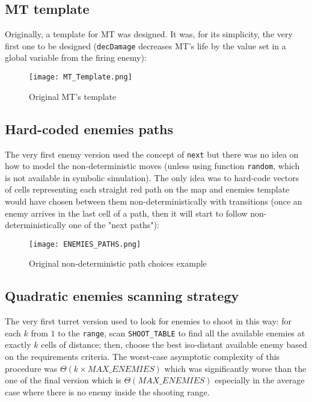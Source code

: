 \documentclass[
10pt, %
a4paper, %
oneside, %
headinclude,footinclude, %
BCOR5mm, %
]{scrartcl}
\begin{document}
		\subsection{MT template}
			Originally, a template for MT was designed. It was, for its simplicity, the very first one to be designed (\texttt{decDamage} decreases MT's life by the value set in a global variable from the firing enemy):
			
			\begin{figure}[h!]
				\centering
				\texttt{[image: MT\_Template.png]}
				\caption{Original MT's template}
			\end{figure}
		\subsection{Hard-coded enemies paths}
			The very first enemy version used the concept of \texttt{next} but there was no idea on how to model the non-deterministic moves (unless using function \texttt{random}, which is not available in symbolic simulation). The only idea was to hard-code vectors of cells representing each straight red path on the map and enemies template would have chosen between them non-deterministically with transitions (once an enemy arrives in the last cell of a path, then it will start to follow non-deterministically one of the "next paths"):
			
			\begin{figure}[h!]
				\centering
				\texttt{[image: ENEMIES\_PATHS.png]}
				\caption{Original non-deterministic path choices example}
			\end{figure}
		\subsection{Quadratic enemies scanning strategy}
			The very first turret version used to look for enemies to shoot in this way: for each $k$ from $1$ to the \texttt{range}, scan \texttt{SHOOT\_TABLE} to find all the available enemies at exactly $k$ cells of distance; then, choose the best iso-distant available enemy based on the requirements criteria. The worst-case asymptotic complexity of this procedure was $\Theta(k\times MAX\_ENEMIES)$ which was significantly worse than the one of the final version which is $\Theta(MAX\_ENEMIES)$ especially in the average case where there is no enemy inside the shooting range.
\end{document}
